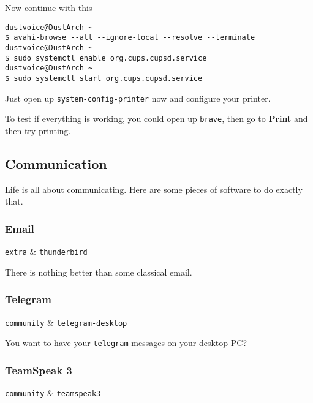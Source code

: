 \documentclass[10pt]{dustdoc}
\begin{document}
Now continue with this

\begin{verbatim}
dustvoice@DustArch ~
$ avahi-browse --all --ignore-local --resolve --terminate
dustvoice@DustArch ~
$ sudo systemctl enable org.cups.cupsd.service
dustvoice@DustArch ~
$ sudo systemctl start org.cups.cupsd.service
\end{verbatim}

Just open up \texttt{system-config-printer} now and configure your printer.

To test if everything is working, you could open up \texttt{brave}, then go to \textbf{Print} and then try printing.

\subsection{Communication}
\label{sec:gui-communication}

Life is all about communicating.
Here are some pieces of software to do exactly that.

\subsubsection{Email}
\label{sec:email}

\begin{packagetable}
    \texttt{extra} & \texttt{thunderbird} \\ 
\end{packagetable}

There is nothing better than some classical email.

\subsubsection{Telegram}
\label{sec:telegram}

\begin{packagetable}
    \texttt{community} & \texttt{telegram-desktop} \\ 
\end{packagetable}

You want to have your \texttt{telegram} messages on your desktop PC?

\subsubsection{TeamSpeak 3}
\label{sec:teamspeak-3}

\begin{packagetable}
    \texttt{community} & \texttt{teamspeak3} \\ 
\end{packagetable}
\end{document}
